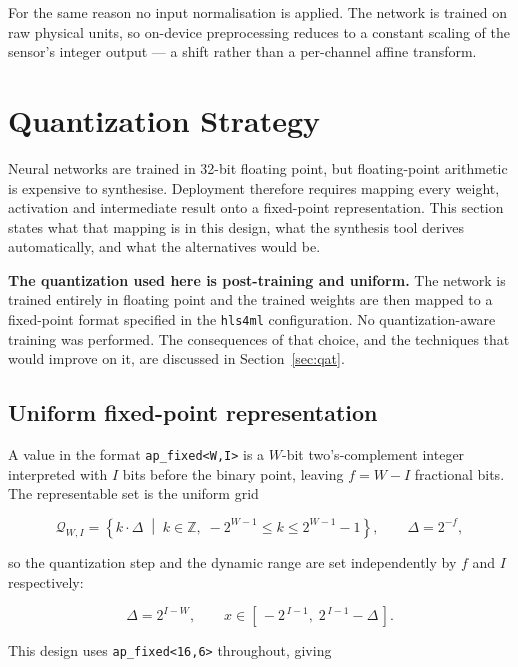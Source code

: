 \documentclass[11pt,a4paper]{article}
\begin{document}
For the same reason no input normalisation is applied. The network is trained
on raw physical units, so on-device preprocessing reduces to a constant scaling
of the sensor's integer output --- a shift rather than a per-channel affine
transform.

\section{Quantization Strategy}
\label{sec:quant}

Neural networks are trained in 32-bit floating point, but floating-point
arithmetic is expensive to synthesise. Deployment therefore requires mapping
every weight, activation and intermediate result onto a fixed-point
representation. This section states what that mapping is in this design, what
the synthesis tool derives automatically, and what the alternatives would be.

\textbf{The quantization used here is post-training and uniform.} The network is
trained entirely in floating point and the trained weights are then mapped to a
fixed-point format specified in the \texttt{hls4ml} configuration. No
quantization-aware training was performed. The consequences of that choice, and
the techniques that would improve on it, are discussed in
Section~\ref{sec:qat}.

\subsection{Uniform fixed-point representation}

A value in the format \texttt{ap\_fixed<W,I>} is a $W$-bit two's-complement
integer interpreted with $I$ bits before the binary point, leaving
$f = W - I$ fractional bits. The representable set is the uniform grid

\begin{equation}
\mathcal{Q}_{W,I} = \left\{ k \cdot \Delta \;\middle|\;
  k \in \mathbb{Z},\;
  -2^{W-1} \le k \le 2^{W-1}-1 \right\},
  \qquad \Delta = 2^{-f},
\end{equation}

so the quantization step and the dynamic range are set independently by $f$ and
$I$ respectively:

\begin{equation}
\Delta = 2^{I-W},
\qquad
x \in \left[\, -2^{\,I-1},\; 2^{\,I-1} - \Delta \,\right].
\end{equation}

This design uses \texttt{ap\_fixed<16,6>} throughout, giving
\end{document}
